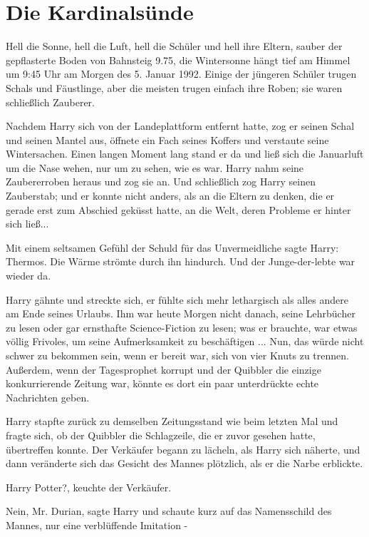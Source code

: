 \chapter{Die Kardinalsünde}

Hell die Sonne, hell die Luft, hell die Schüler und hell ihre Eltern, sauber der
gepflasterte Boden von Bahnsteig 9.75, die Wintersonne hängt tief am Himmel um
9:45 Uhr am Morgen des 5. Januar 1992. Einige der jüngeren Schüler trugen Schals
und Fäustlinge, aber die meisten trugen einfach ihre Roben; sie waren
schließlich Zauberer.

Nachdem Harry sich von der Landeplattform entfernt hatte, zog er seinen Schal
und seinen Mantel aus, öffnete ein Fach seines Koffers und verstaute seine
Wintersachen. Einen langen Moment lang stand er da und ließ sich die Januarluft
um die Nase wehen, nur um zu sehen, wie es war. Harry nahm seine Zaubererroben
heraus und zog sie an. Und schließlich zog Harry seinen Zauberstab; und er
konnte nicht anders, als an die Eltern zu denken, die er gerade erst zum
Abschied geküsst hatte, an die Welt, deren Probleme er hinter sich ließ...

Mit einem seltsamen Gefühl der Schuld für das Unvermeidliche sagte Harry: \glqq{}
Thermos.\grqq{} Die Wärme strömte durch ihn hindurch. Und der Junge-der-lebte
war wieder da.

Harry gähnte und streckte sich, er fühlte sich mehr lethargisch als alles andere
am Ende seines Urlaubs. Ihm war heute Morgen nicht danach, seine Lehrbücher zu
lesen oder gar ernsthafte Science-Fiction zu lesen; was er brauchte, war etwas
völlig Frivoles, um seine Aufmerksamkeit zu beschäftigen ... Nun, das würde
nicht schwer zu bekommen sein, wenn er bereit war, sich von vier Knuts zu
trennen. Außerdem, wenn der Tagesprophet korrupt und der Quibbler die einzige
konkurrierende Zeitung war, könnte es dort ein paar unterdrückte echte
Nachrichten geben.

Harry stapfte zurück zu demselben Zeitungsstand wie beim letzten Mal und fragte
sich, ob der Quibbler die Schlagzeile, die er zuvor gesehen hatte, übertreffen
konnte. Der Verkäufer begann zu lächeln, als Harry sich näherte, und dann
veränderte sich das Gesicht des Mannes plötzlich, als er die Narbe erblickte.

\glqq{}Harry Potter?\grqq{}, keuchte der Verkäufer.

\glqq{}Nein, Mr. Durian\grqq{}, sagte Harry und schaute kurz auf das
Namensschild des Mannes, \glqq{}nur eine verblüffende Imitation -\grqq{}

